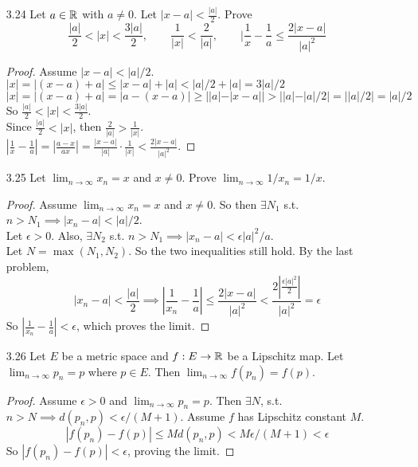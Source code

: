 \documentclass[14pt]{extarticle}
\begin{document}
\begin{enumerate}
		\item[3.24] Let $a \in \mathbb{R}$ with $a \neq 0$. Let $|x - a| < \frac{|a|}{2}$. Prove
		\[\frac{|a|}{2} < |x| < \frac{3|a|}{2},\qquad \frac{1}{|x|} < \frac{2}{|a|},\qquad |\frac{1}{x}-\frac{1}{a}\leq \frac{2|x-a|}{|a|^2}\]
		\begin{proof}
			Assume $|x-a| < |a|/2$.\\
			$|x| = |(x - a) + a | \leq |x-a| + |a| < |a|/2 + |a| = 3|a|/2$\\
			$|x| = |(x-a) + a| = |a - (x - a)| \geq ||a| - |x-a|| > ||a|-|a|/2| = ||a|/2| = |a|/2$\\
			So $\frac{|a|}{2} < |x| < \frac{3|a|}{2}$.\\
			Since $\frac{|a|}{2} < |x|$, then $\frac{2}{|a|} > \frac{1}{|x|}$.\\
			$|\frac{1}{x} - \frac{1}{a}| = |\frac{a-x}{ax}| = \frac{|x-a|}{|a|}\cdot\frac{1}{|x|} < \frac{2|x-a|}{|a|^2}$.
		\end{proof}
		
		\item[3.25] Let $\lim_{n\rightarrow\infty} x_n = x$ and $x \neq 0$. Prove $\lim_{n\rightarrow\infty} 1/x_n = 1/x$.
		\begin{proof}
			Assume $\lim_{n\rightarrow\infty} x_n = x$ and $x \neq 0$. So then $\exists N_1$ s.t. $n>N_1 \implies |x_n - a| < |a|/2$.\\
			Let $\epsilon >0$. Also, $\exists N_2$ s.t. $n>N_1 \implies |x_n - a| < \epsilon|a|^2/a$.\\
			Let $N = \max(N_1,N_2)$. So the two inequalities still hold. By the last problem,\\
			\[|x_n-a|<\frac{|a|}{2} \implies |\frac{1}{x_n}-\frac{1}{a}|\leq\frac{2|x-a|}{|a|^2} < \frac{2|\frac{\epsilon|a|^2}{2}|}{|a|^2} = \epsilon\]
			So $|\frac{1}{x_n} - \frac{1}{a}| < \epsilon$, which proves the limit.
		\end{proof}
		
		\item[3.26] Let $E$ be a metric space and $f : E \rightarrow \mathbb{R}$ be a Lipschitz map. Let $\lim_{n\rightarrow\infty} p_n = p$ where $p \in E$. Then $\lim_{n\rightarrow\infty} f(p_n) = f(p)$.
		\begin{proof}
			Assume $\epsilon>0$ and $\lim_{n\rightarrow\infty} p_n = p$. Then $\exists N$, s.t. $n>N \implies d(p_n,p) < \epsilon/(M+1)$. Assume $f$ has Lipschitz constant $M$.
			\[|f(p_n) - f(p)| \leq Md(p_n,p) < M\epsilon/(M+1) < \epsilon\]
			So $|f(p_n) - f(p)| < \epsilon$, proving the limit.
		\end{proof}
	\end{enumerate}
\end{document}
